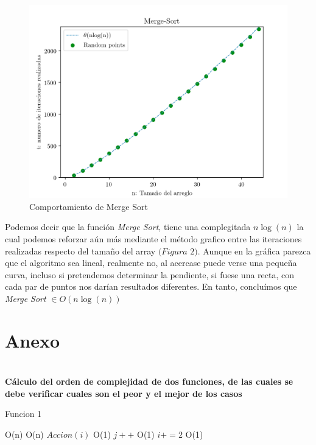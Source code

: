 \documentclass[12pt,twoside]{article}
\begin{document}
\begin{figure}
  \centering
    \includegraphics[height=0.5\textwidth]{Figure2}
  \caption{Comportamiento de Merge Sort}
  \label{fig:ejemplo3}
\end{figure}

Podemos decir que la función \textit{Merge Sort}, tiene una complegitada $n \log(n)$ la cual podemos reforzar aún más mediante el 
método grafico entre las iteraciones realizadas respecto del tamaño del array $(Figura$ $2)$. Aunque en la gráfica parezca que 
el algoritmo sea lineal, realmente no, al acercase puede verse una pequeña curva, incluso si pretendemos determinar la pendiente,
si fuese una recta, con cada par de puntos nos darían resultados diferentes. En tanto, concluímos que \textit{Merge Sort} $\in O(n \log(n))$

\newpage

\section{Anexo} 
\text{}\\ 
\textbf{Cálculo del orden de complejidad de dos funciones, de las cuales se debe verificar cuales son el peor y el mejor de los casos}\\ \begin{algorithm}

\caption{Funcion 1}\label{euclid}
\begin{algorithmic}[1]
     \Comment O(n)
       \Comment O(n)
          \State $Accion(i)$  \Comment O(1)
          \State \textbf{$j++$} \Comment O(1)   
      \EndFor
      \State \textit{$i += 2$}  \Comment O(1)    
    \EndWhile
  \EndFunction
\end{algorithmic}
\end{algorithm}
\end{document}
